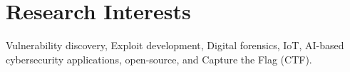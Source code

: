 
\section{Research Interests}

    \itemizeCVBegin[nolabel]{}

        \small
        \item{Vulnerability discovery, Exploit development, Digital forensics, IoT, AI-based cybersecurity applications, open-source, and Capture the Flag (CTF).}

    \itemizeCVEnd

